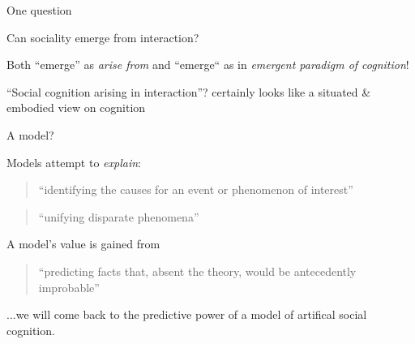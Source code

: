 \documentclass[handout,compress]{beamer}
\begin{document}
\begin{frame}{One question}

    \Large
    \centering

    Can sociality emerge from interaction?

    \pause
    \normalsize
    \vspace{2em}

    Both ``emerge'' as \emph{arise from} and ``emerge`` as in \emph{emergent paradigm of
    cognition}!

    \pause

    ``Social cognition arising in interaction''? certainly looks like a situated \&
    embodied view on cognition

\end{frame}


{
\begin{frame}{A model?}

    Models attempt to \emph{explain}: 
    \begin{quote}
        ``identifying the causes for an event or phenomenon of interest''
    \end{quote}
    \begin{quote}
        ``unifying disparate phenomena''
    \end{quote}

        A model's value is gained from
    \begin{quote}
        ``predicting facts that, absent the theory, would be antecedently
        improbable''
    \end{quote}

    \pause

    ...we will come back to the predictive power of a model of artifical social
    cognition.

\end{frame}
}

\end{document}
